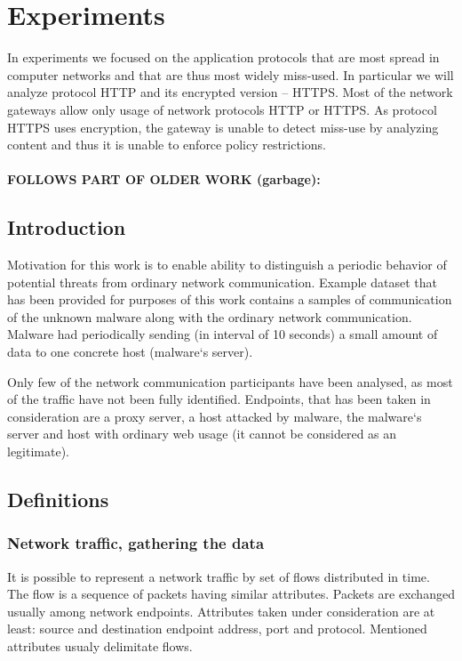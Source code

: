 \chapter{Experiments}\label{sec:experiments}

\cite{rossum2011python,oliphant2006numpy,pedregosa2011scikit}

In experiments we focused on the application protocols that are most 
spread in computer networks and that are thus most widely miss-used. 
In particular we will analyze protocol HTTP and its encrypted version -- HTTPS. 
Most of the network gateways allow only usage of network protocols HTTP or HTTPS. 
As protocol HTTPS uses encryption, the gateway is unable to detect miss-use by 
analyzing content and thus it is unable to enforce policy restrictions.
~\\
~\\
\textbf{FOLLOWS PART OF OLDER WORK (garbage):}

\section{Introduction}
Motivation for this work is to enable ability to distinguish a periodic behavior of potential threats from ordinary network communication. Example dataset that has been provided for purposes of this work contains a samples of communication of the unknown malware along with the ordinary network communication. Malware had periodically sending  (in interval of 10 seconds) a small amount of data to one concrete host (malware`s server).

Only few of the network communication participants have been analysed, as most of the traffic have not been fully identified. Endpoints, that has been taken in consideration are a proxy server, a host attacked by malware, the malware`s server and host with ordinary web usage (it cannot be considered as an legitimate).

\section{Definitions}
\subsection{Network traffic, gathering the data}
It is possible to represent a network traffic by set of flows distributed in time. The flow is a sequence of packets having  similar attributes. Packets are exchanged usually among network endpoints. Attributes taken under consideration are at least: source and destination endpoint address, port and protocol. Mentioned attributes usualy delimitate flows.

